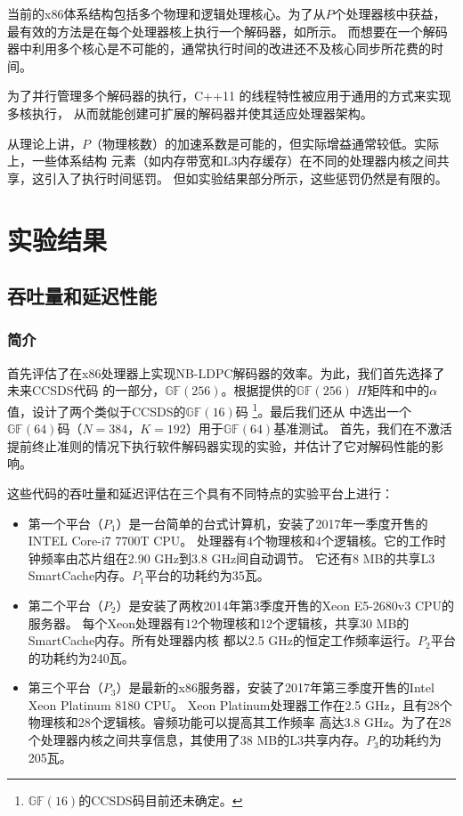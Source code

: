 \documentclass{cjc}
\begin{document}
  当前的x86体系结构包括多个物理和逻辑处理核心。为了从$P$个处理器核中获益，
  最有效的方法是在每个处理器核上执行一个解码器，如\cite{gal_high-throughput_2016}所示。
  而想要在一个解码器中利用多个核心是不可能的，通常执行时间的改进还不及核心同步所花费的时间。

  为了并行管理多个解码器的执行，C++11 的线程特性被应用于通用的方式来实现多核执行，
  从而就能创建可扩展的解码器并使其适应处理器架构。

  从理论上讲，$P$（物理核数）的加速系数是可能的，但实际增益通常较低。实际上，一些体系结构
  元素（如内存带宽和L3内存缓存）在不同的处理器内核之间共享，这引入了执行时间惩罚。
  但如实验结果部分所示，这些惩罚仍然是有限的。

\section{实验结果}\label{sec:experiment}
\subsection{吞吐量和延迟性能}
\subsubsection{简介}\label{sssec:experiment11}

  首先评估了在x86处理器上实现NB-LDPC解码器的效率。为此，我们首先选择了未来CCSDS代码\cite{CCSDS_2015}
  的一部分，$\mathbb{GF}(256)$。根据\cite{dolecek_non-binary_2014}提供的$\mathbb{GF}(256)$
  $H$矩阵和\cite{poulliat_design_2008}中的$\alpha$值，设计了两个类似于CCSDS的$\mathbb{GF}(16)$码
  \footnote{$\mathbb{GF}(16)$的CCSDS码目前还未确定。}。最后我们还从\cite{noauthor_helmling_nodate}
  中选出一个$\mathbb{GF}(64)$码（$N=384，K=192$）用于$\mathbb{GF}(64)$基准测试。
  首先，我们在不激活提前终止准则的情况下执行软件解码器实现的实验，并估计了它对解码性能的影响。
  
  这些代码的吞吐量和延迟评估在三个具有不同特点的实验平台上进行：
\begin{itemize}
  \item 第一个平台（$P_1$）是一台简单的台式计算机，安装了2017年一季度开售的INTEL Core-i7 7700T CPU。
  处理器有4个物理核和4个逻辑核。它的工作时钟频率由芯片组在2.90 GHz到3.8 GHz间自动调节。
  它还有8 MB的共享L3 SmartCache内存。$P_1$平台的功耗约为35瓦。 
  \item 第二个平台（$P_2$）是安装了两枚2014年第3季度开售的Xeon E5-2680v3 CPU的服务器。
  每个Xeon处理器有12个物理核和12个逻辑核，共享30 MB的SmartCache内存。所有处理器内核
  都以2.5 GHz的恒定工作频率运行。$P_2$平台的功耗约为240瓦。
  \item 第三个平台（$P_3$）是最新的x86服务器，安装了2017年第三季度开售的Intel Xeon Platinum 8180 CPU。
  Xeon Platinum处理器工作在2.5 GHz，且有28个物理核和28个逻辑核。睿频功能可以提高其工作频率
  高达3.8 GHz。为了在28个处理器内核之间共享信息，其使用了38 MB的L3共享内存。$P_3$的功耗约为205瓦。
\end{itemize}
  
\end{document}
